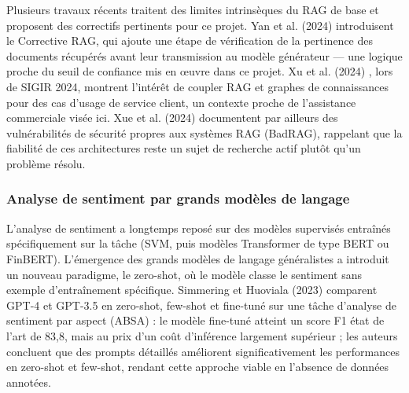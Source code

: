 Plusieurs travaux récents traitent des limites intrinsèques du RAG de base et proposent des correctifs
pertinents pour ce projet. Yan et al. (2024) \cite{yan2024} introduisent le Corrective RAG, qui ajoute une
étape de vérification de la pertinence des documents récupérés avant leur transmission au modèle générateur
--- une logique proche du seuil de confiance mis en œuvre dans ce projet. Xu et al. (2024) \cite{xu2024},
lors de SIGIR 2024, montrent l'intérêt de coupler RAG et graphes de connaissances pour des cas d'usage de
service client, un contexte proche de l'assistance commerciale visée ici. Xue et al. (2024) \cite{xue2024}
documentent par ailleurs des vulnérabilités de sécurité propres aux systèmes RAG (BadRAG), rappelant que la
fiabilité de ces architectures reste un sujet de recherche actif plutôt qu'un problème résolu.

\subsubsection{Analyse de sentiment par grands modèles de langage}

L'analyse de sentiment a longtemps reposé sur des modèles supervisés entraînés spécifiquement sur la tâche
(SVM, puis modèles Transformer de type BERT ou FinBERT). L'émergence des grands modèles de langage
généralistes a introduit un nouveau paradigme, le zero-shot, où le modèle classe le sentiment sans exemple
d'entraînement spécifique. Simmering et Huoviala (2023) \cite{simmering2023} comparent GPT-4 et GPT-3.5 en
zero-shot, few-shot et fine-tuné sur une tâche d'analyse de sentiment par aspect (ABSA) : le modèle fine-tuné
atteint un score F1 état de l'art de 83,8, mais au prix d'un coût d'inférence largement supérieur ; les
auteurs concluent que des prompts détaillés améliorent significativement les performances en zero-shot et
few-shot, rendant cette approche viable en l'absence de données annotées.

